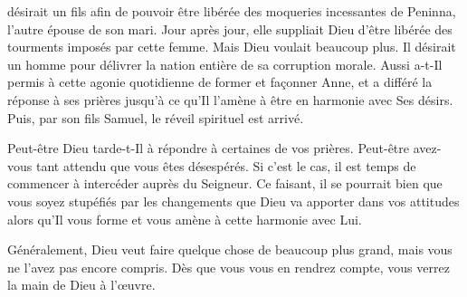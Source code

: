 




 désirait un fils afin de pouvoir être libérée
 des moqueries incessantes de Peninna, l'autre épouse de son mari.
 Jour après jour, elle suppliait Dieu d'être libérée des tourments
 imposés par cette femme.
 Mais Dieu voulait beaucoup plus. Il désirait un homme pour délivrer
 la nation entière de sa corruption morale.
 Aussi a-t-Il permis à cette agonie quotidienne de former et façonner Anne,
 et a différé la réponse à ses prières jusqu'à ce qu'Il l'amène
 à être en harmonie avec Ses désirs.
 Puis, par son fils Samuel, le réveil spirituel est arrivé.

Peut-être Dieu tarde-t-Il à répondre à certaines de vos prières.
 Peut-être avez-vous tant attendu que vous êtes désespérés.
 Si c'est le cas, il est temps de commencer à intercéder auprès du Seigneur.
 Ce faisant, il se pourrait bien que vous soyez stupéfiés par les changements
 que Dieu va apporter dans vos attitudes alors qu'Il vous forme
 et vous amène à cette harmonie avec Lui.


Généralement, Dieu veut faire quelque chose de beaucoup plus grand,
 mais vous ne l'avez pas encore compris.
 Dès que vous vous en rendrez compte, vous verrez la main de Dieu à l'œuvre. 

\dvrule





